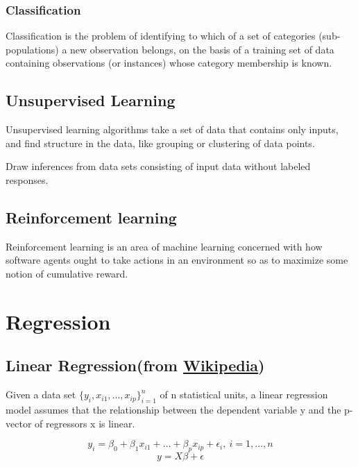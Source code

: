 \documentclass{article}
\begin{document}
\subsubsection{Classification}

Classification is the problem of identifying to which 
of a set of categories (sub-populations) a new observation 
belongs, on the basis of a training set of data containing 
observations (or instances) whose category membership is known.

\subsection{Unsupervised Learning}

Unsupervised learning algorithms take a set of data that 
contains only inputs, and find structure in the data, like 
grouping or clustering of data points.

\bigskip

\noindent Draw inferences from data sets consisting of input 
data without labeled responses.

\subsection{Reinforcement learning}
       
Reinforcement learning is an area of machine learning concerned 
with how software agents ought to take actions in an environment 
so as to maximize some notion of cumulative reward.

\section{Regression}

\subsection{Linear Regression(from \href{https://en.wikipedia.org/wiki/Linear_regression\#:~:text=In\%20statistics\%2C\%20linear\%20regression\%20is,is\%20called\%20simple\%20linear\%20regression.}{Wikipedia})}

Given a data set \(\{y_i, x_{i1}, ..., x_{ip}\}_{i=1}^n\) of n statistical units, a linear regression model assumes that the relationship between the dependent variable y and the p-vector of regressors x is linear.

\[y_i = \beta_0 + \beta_{1}x_{i1} + \dots + \beta_{p}x_{ip} + \epsilon_i, \: i = 1, \dots, n\]
\[y = X\beta + \epsilon\]
\end{document}
